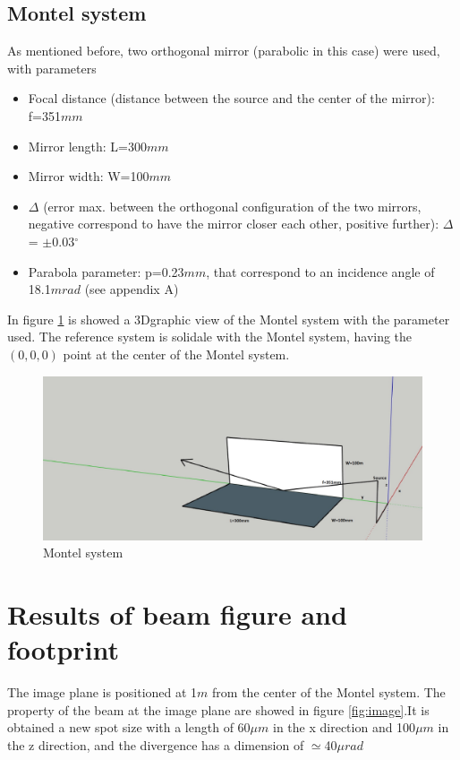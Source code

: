 \documentclass[a4paper]{article}
\begin{document}
\subsection{Montel system}

As mentioned before, two orthogonal mirror (parabolic in this case) were used, with parameters
\begin{itemize}
\item Focal distance (distance between the source and the center of the mirror): f=351$mm$
\item Mirror length: L=300$mm$
\item Mirror width:  W=100$mm$
\item $\Delta$ (error max. between the orthogonal configuration of the two mirrors, negative correspond to have the mirror closer each other, positive further):      $\Delta$ = $\pm$0.03$^{\circ}$
\item Parabola parameter: p=0.23$mm$, that correspond to an incidence angle of 18.1$mrad$ (see appendix A)
\end{itemize}

In figure \ref{fig:Montel system} is showed a 3Dgraphic view of the Montel system with the parameter used. The reference system is solidale with the Montel system, having the $(0,0,0)$ point at the center of the Montel system.


\begin{figure}[H]
\centering
\includegraphics[width=1\textwidth]{MontelSystem.jpg}
\caption{\label{fig:Montel system} Montel system}
\end{figure}

\newpage

\section{Results of beam figure and footprint}

The image plane is positioned at 1$m$ from the center of the Montel system. The property of the beam at the image plane are showed in figure \ref{fig:image}.It is obtained a new spot size with a length of 60$\mu$$m$ in the x direction and 100$\mu$$m$ in the z direction, and the divergence has a dimension  of $\simeq$40$\mu$$rad$
\end{document}
